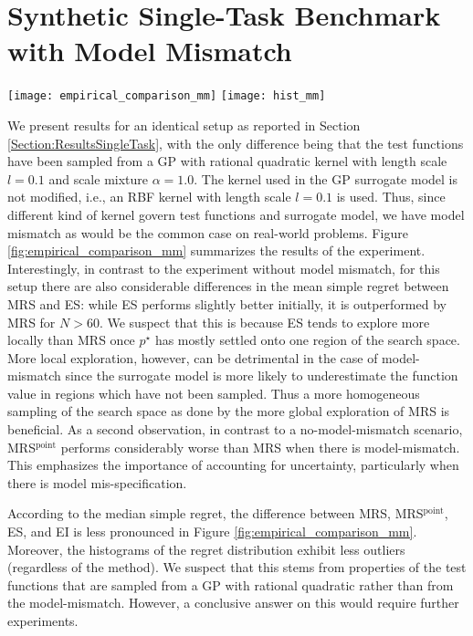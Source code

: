 
\section{Synthetic Single-Task Benchmark with Model Mismatch}
\label{section:exp_model_mismatch}

\begin{figure*}
\centering
\texttt{[image: empirical\_comparison\_mm]}
\texttt{[image: hist\_mm]}
\caption{(Top) Median and mean simple regret over $250$ repetitions for different acquisition functions. Shown is the simple regret of the recommendation $\mathbf{\tilde x}_N$ after $N$ trials, i.e., the point which maximizes the GP posterior
mean. (Bottom) Histogram of the simple regret after performing $N=100$ trials for different acquisition functions (note the log-scales).}
\label{fig:empirical_comparison_mm}
\end{figure*}

We present results for an identical setup as reported in Section \ref{Section:ResultsSingleTask},
with the
only difference being that the test functions have been sampled from a GP with
rational quadratic kernel with length scale $l=0.1$ and scale mixture
$\alpha=1.0$. The kernel used in the GP surrogate model is not modified, i.e.,
an RBF kernel with length scale $l=0.1$ is used. Thus, since different kind of
kernel govern test functions and surrogate model, we have model mismatch as
would be the common case on real-world problems. Figure
\ref{fig:empirical_comparison_mm} summarizes the results of the experiment.
Interestingly, in contrast to the experiment without model mismatch, for this setup
there are also considerable differences in the mean simple regret between MRS
and ES: while ES performs slightly better initially, it is outperformed by MRS
for $N > 60$. We suspect that this is because ES tends to explore more locally
than MRS once $p^\star$ has mostly settled onto one region of the search
space. More local exploration, however, can be detrimental in the case of
model-mismatch since the surrogate model is more likely to underestimate the
function value in regions which have not been sampled. Thus a more homogeneous
sampling of the search space as done by the more global exploration of MRS is
beneficial. As a second observation, in contrast to a no-model-mismatch
scenario, MRS$^\text{point}$ performs considerably worse than MRS when there
is model-mismatch. This emphasizes the importance of accounting for
uncertainty, particularly when there is model mis-specification.

According to the median simple regret, the difference between MRS,
MRS$^\text{point}$, ES, and EI is less pronounced in Figure
\ref{fig:empirical_comparison_mm}. Moreover, the histograms of the regret
distribution exhibit less outliers (regardless of the method). We suspect that
this stems from properties of the test functions that are sampled from a GP
with rational quadratic rather than from the model-mismatch. However,
a conclusive answer on this would require further experiments.

